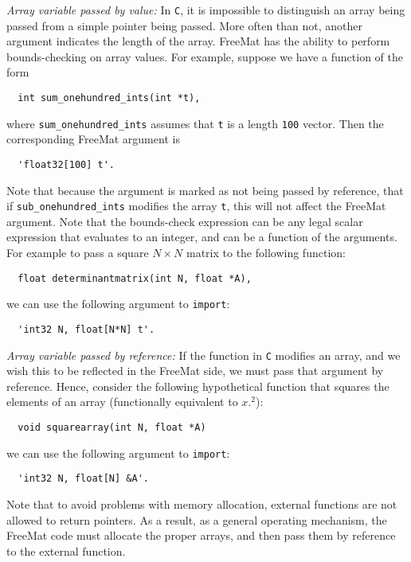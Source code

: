 \emph{Array variable passed by value:}
In \verb|C|, it is impossible to distinguish an array being passed from
a simple pointer being passed.  More often than not, another argument
indicates the length of the array.  FreeMat has the ability to perform
bounds-checking on array values.  For example, suppose we have a function
of the form
\begin{verbatim}
  int sum_onehundred_ints(int *t),
\end{verbatim}
where \verb|sum_onehundred_ints| assumes that \verb|t| is a length \verb|100| vector. 
Then the corresponding FreeMat argument is
\begin{verbatim}
  'float32[100] t'.
\end{verbatim}
Note that because the argument is marked as not being passed by reference,
that if \verb|sub_onehundred_ints| modifies the array \verb|t|, this
will not affect the FreeMat argument.  Note that the bounds-check expression
can be any legal scalar expression that evaluates to an integer, and can be
a function of the arguments.  For example to pass a square $N \times N$ 
matrix to the following function:
\begin{verbatim}
  float determinantmatrix(int N, float *A),
\end{verbatim}
we can use the following argument to \verb|import|:
\begin{verbatim}
  'int32 N, float[N*N] t'.
\end{verbatim}

\emph{Array variable passed by reference:}
If the function in \verb|C| modifies an array, and we wish this to be
reflected in the FreeMat side, we must pass that argument by reference.
Hence, consider the following hypothetical function that squares the
elements of an array (functionally equivalent to $x.^2$):
\begin{verbatim}
  void squarearray(int N, float *A)
\end{verbatim}
we can use the following argument to \verb|import|:
\begin{verbatim}
  'int32 N, float[N] &A'.
\end{verbatim}
Note that to avoid problems with memory allocation, external functions
are not allowed to return pointers.  As a result, as a general operating
mechanism, the FreeMat code must allocate the proper arrays, and then
pass them by reference to the external function.

